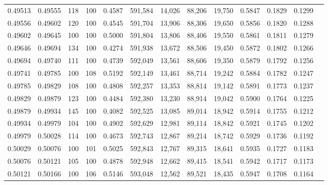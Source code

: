 \begin{tabular}{rrrrrrrrrrrrr}
0.49513 & 0.49555 &    118 & 100 &                                     0.4587 & 591,584 &  14,026 &  88,206 &  19,750 & 0.5847 & 0.1829 & 0.1299 \\
0.49556 & 0.49602 &    120 & 100 &                                     0.4545 & 591,704 &  13,906 &  88,306 &  19,650 & 0.5856 & 0.1820 & 0.1288 \\
0.49602 & 0.49645 &    100 & 100 &                                     0.5000 & 591,804 &  13,806 &  88,406 &  19,550 & 0.5861 & 0.1811 & 0.1279 \\
0.49646 & 0.49694 &    134 & 100 &                                     0.4274 & 591,938 &  13,672 &  88,506 &  19,450 & 0.5872 & 0.1802 & 0.1266 \\
0.49694 & 0.49740 &    111 & 100 &                                     0.4739 & 592,049 &  13,561 &  88,606 &  19,350 & 0.5879 & 0.1792 & 0.1256 \\
0.49741 & 0.49785 &    100 & 108 &                                     0.5192 & 592,149 &  13,461 &  88,714 &  19,242 & 0.5884 & 0.1782 & 0.1247 \\
0.49785 & 0.49829 &    108 & 100 &                                     0.4808 & 592,257 &  13,353 &  88,814 &  19,142 & 0.5891 & 0.1773 & 0.1237 \\
0.49829 & 0.49879 &    123 & 100 &                                     0.4484 & 592,380 &  13,230 &  88,914 &  19,042 & 0.5900 & 0.1764 & 0.1225 \\
0.49879 & 0.49934 &    145 & 100 &                                     0.4082 & 592,525 &  13,085 &  89,014 &  18,942 & 0.5914 & 0.1755 & 0.1212 \\
0.49934 & 0.49979 &    104 & 100 &                                     0.4902 & 592,629 &  12,981 &  89,114 &  18,842 & 0.5921 & 0.1745 & 0.1202 \\
0.49979 & 0.50028 &    114 & 100 &                                     0.4673 & 592,743 &  12,867 &  89,214 &  18,742 & 0.5929 & 0.1736 & 0.1192 \\
0.50029 & 0.50076 &    100 & 101 &                                     0.5025 & 592,843 &  12,767 &  89,315 &  18,641 & 0.5935 & 0.1727 & 0.1183 \\
0.50076 & 0.50121 &    105 & 100 &                                     0.4878 & 592,948 &  12,662 &  89,415 &  18,541 & 0.5942 & 0.1717 & 0.1173 \\
0.50121 & 0.50166 &    100 & 106 &                                     0.5146 & 593,048 &  12,562 &  89,521 &  18,435 & 0.5947 & 0.1708 & 0.1164 \\

\end{tabular}
